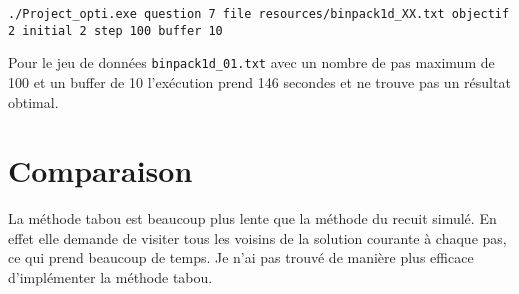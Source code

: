 \documentclass[10pt,a4paper]{article}
\begin{document}
\texttt{./Project\_opti.exe question 7 file resources/binpack1d\_XX.txt objectif 2 initial 2 step 100 buffer 10}

Pour le jeu de données \texttt{binpack1d\_01.txt} avec un nombre de pas maximum de 100 et un buffer de 10 l'exécution prend 146 secondes et ne trouve pas un résultat obtimal.

\section{Comparaison}

La méthode tabou est beaucoup plus lente que la méthode du recuit simulé. En effet elle demande de visiter tous les voisins de la solution courante à chaque pas, ce qui prend beaucoup de temps.
Je n'ai pas trouvé de manière plus efficace d'implémenter la méthode tabou.
\end{document}
